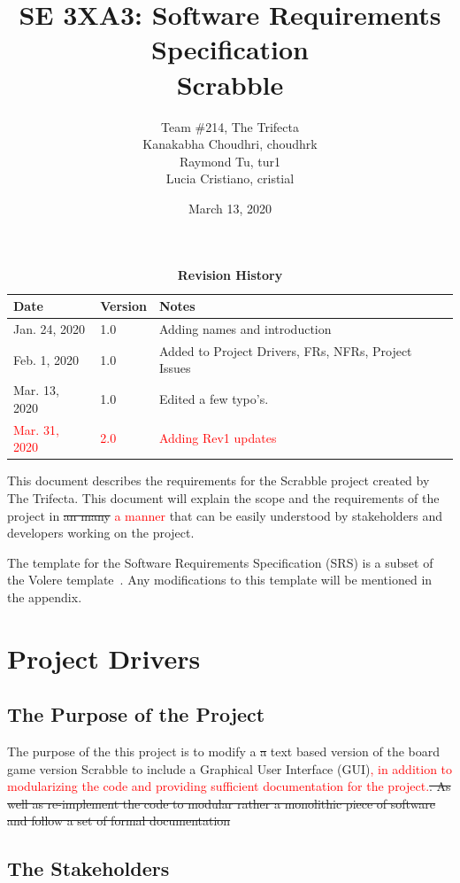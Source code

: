 \documentclass[12pt, titlepage]{article}
\title{SE 3XA3: Software Requirements Specification\\Scrabble}
\author{Team \#214, The Trifecta
		\\Kanakabha Choudhri, choudhrk
		\\ Raymond Tu, tur1
		\\ Lucia Cristiano, cristial
}
\date{March 13, 2020}
\begin{document}
\maketitle

\tableofcontents
\listoftables
\listoffigures

\begin{table}[bp]
\caption{\bf Revision History}
\begin{tabularx}{\textwidth}{p{3cm}p{2cm}X}
\toprule {\bf Date} & {\bf Version} & {\bf Notes}\\
\midrule
Jan. 24, 2020 & 1.0 & Adding names and introduction\\
Feb. 1, 2020 & 1.0 & Added to Project Drivers, FRs, NFRs, Project Issues\\
Mar. 13, 2020 & 1.0 & Edited a few typo's. \\
\textcolor{red}{Mar. 31, 2020} & \textcolor{red}{2.0} & \textcolor{red}{Adding Rev1 updates}
\bottomrule
\end{tabularx}
\end{table}

\newpage

This document describes the requirements for the Scrabble project created by The Trifecta. This document will explain the scope and the requirements of the project in \sout{an many} \textcolor{red}{a manner} that can be easily understood by stakeholders and developers working on the project.

The template for the Software Requirements Specification (SRS) is a subset of the Volere template~\cite{robertson_robertson}. Any modifications to this template will be mentioned in the appendix.
\section{Project Drivers}

\subsection{The Purpose of the Project}
The purpose of the this project is to modify a \sout{a} text based version of the board game version Scrabble to include a Graphical User Interface (GUI)\textcolor{red}{, in addition to modularizing the code and providing sufficient documentation for the project.}\sout{. As well as re-implement the code to modular rather a monolithic piece of software and follow a set of formal documentation} 
\subsection{The Stakeholders}
\end{document}
